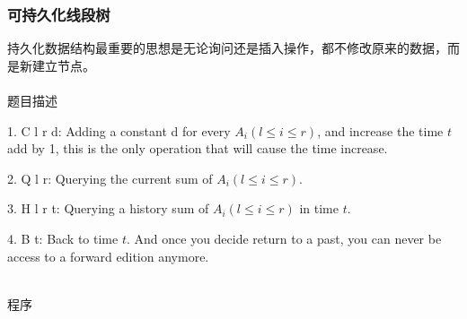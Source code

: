 \subsubsection{可持久化线段树}
持久化数据结构最重要的思想是无论询问还是插入操作，都不修改原来的数据，而是新建立节点。
~\\
~\\
\Large{题目描述} \par
\small
1. C l r d: Adding a constant d for every $A_i(l\leq i\leq r)$, and increase the time $t$ add by 1, this is the only operation that will cause the time increase. \par
2. Q l r: Querying the current sum of $A_i(l \leq i \leq r)$. \par
3. H l r t: Querying a history sum of $A_i(l \leq i\leq r)$ in time $t$. \par
4. B t: Back to time $t$. And once you decide return to a past, you can never be access to a forward edition anymore.\par
~\\
\Large{程序} \par
\small
